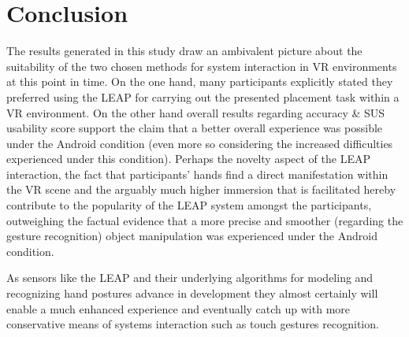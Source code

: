 \section{Conclusion}
The results generated in this study draw an ambivalent picture about the suitability of the two chosen methods for system interaction in VR environments at this point in time.
On the one hand, many participants explicitly stated they preferred using the LEAP for carrying out the presented placement task within a VR environment.
On the other hand overall results regarding accuracy \& SUS usability score support the claim that a better overall experience was possible under the Android condition (even more so considering the increased difficulties experienced under this condition).
Perhaps the novelty aspect of the LEAP interaction, the fact that participants' hands find a direct manifestation within the VR scene and the arguably much higher immersion that is facilitated hereby contribute to the popularity of the LEAP system amongst the participants, outweighing the factual evidence that a more precise and smoother (regarding the gesture recognition) object manipulation was experienced under the Android condition.

As sensors like the LEAP and their underlying algorithms for modeling and recognizing hand postures advance in development they almost certainly will enable a much enhanced experience and eventually catch up with more conservative means of systems interaction such as touch gestures recognition.